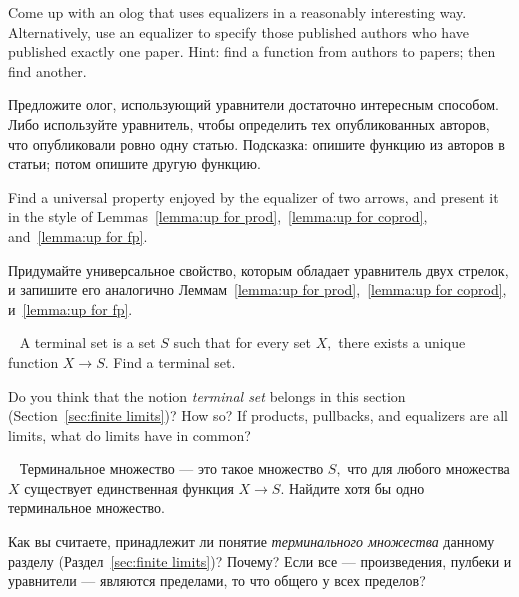 \documentclass[../main/CT4S-EN-RU]{subfiles}
\begin{document}
\begin{exerciseENG}
Come up with an olog that uses equalizers in a reasonably interesting way. Alternatively, use an equalizer to specify those published authors who have published exactly one paper. Hint: find a function from authors to papers; then find another.
\end{exerciseENG}

\begin{exerciseRUS}
Предложите олог, использующий уравнители достаточно интересным способом. Либо используйте уравнитель, чтобы определить тех опубликованных авторов, что опубликовали ровно одну статью. Подсказка: опишите функцию из авторов в статьи; потом опишите другую функцию.
\end{exerciseRUS}

\begin{exerciseENG}
Find a universal property enjoyed by the equalizer of two arrows, and present it in the style of Lemmas~\ref{lemma:up for prod},~\ref{lemma:up for coprod}, and~\ref{lemma:up for fp}.
\end{exerciseENG}

\begin{exerciseRUS}
Придумайте универсальное свойство, которым обладает уравнитель двух стрелок, и запишите его аналогично Леммам~\ref{lemma:up for prod},~\ref{lemma:up for coprod}, и~\ref{lemma:up for fp}.
\end{exerciseRUS}

\begin{exerciseENG}~
\sexc A terminal set is a set $S$ such that for every set $X,$ there exists a unique function $X{→} S.$ Find a terminal set. 
\item Do you think that the notion {\em terminal set} belongs in this section (Section~\ref{sec:finite limits})? How so? If products, pullbacks, and equalizers are all limits, what do limits have in common?
\endsexc
\end{exerciseENG}

\begin{exerciseRUS}~
\sexc Терминальное множество — это такое множество $S,$ что для любого множества $X$ существует единственная функция $X{→} S.$ Найдите хотя бы одно терминальное множество. 
\item Как вы считаете, принадлежит ли понятие {\em терминального множества} данному разделу (Раздел~\ref{sec:finite limits})? Почему? Если все — произведения, пулбеки и уравнители — являются пределами, то что общего у всех пределов?
\endsexc
\end{exerciseRUS}
\end{document}
